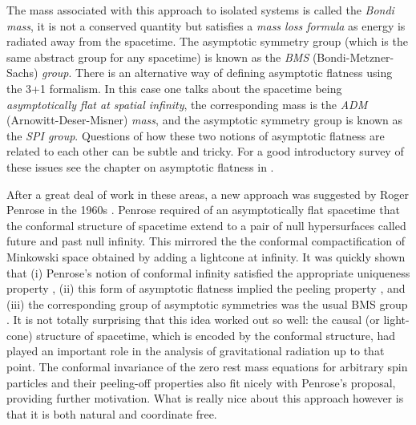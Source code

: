 \documentclass[a4paper,12pt]{amsart}
\theoremstyle{remark}
\begin{document}
The mass associated with this approach to isolated systems is called
the \emph{Bondi mass}, it is not a conserved quantity but satisfies
a \emph{mass loss formula} as energy is radiated away from the spacetime.
The asymptotic symmetry group (which is the same abstract group for
any spacetime) is known as the \emph{BMS} (Bondi-Metzner-Sachs) \emph{group}.
There is an alternative way of defining asymptotic flatness using
the 3+1 formalism. In this case one talks about the spacetime being
\emph{asymptotically flat at spatial infinity}, the corresponding
mass is the \emph{ADM} (Arnowitt-Deser-Misner) \emph{mass}, and the
asymptotic symmetry group is known as the \emph{SPI group}. Questions
of how these two notions of asymptotic flatness are related to each
other can be subtle and tricky. For a good introductory survey of
these issues see the chapter on asymptotic flatness in \cite{Wald}.

After a great deal of work in these areas, a new approach was
suggested by Roger Penrose in the 1960s
\cite{Penrose-ConfInfLetter,Penrose-LightConeInf,Penrose-zrmFieldAsympt}.
Penrose required of an asymptotically flat spacetime that the
conformal structure of spacetime extend to a pair of null
hypersurfaces called future and past null infinity. This mirrored the
the conformal compactification of Minkowski space obtained by adding a
lightcone at infinity. It was quickly shown that (i) Penrose's notion
of conformal infinity satisfied the appropriate uniqueness property \cite{Geroch-LocalChar},
(ii) this form of asymptotic flatness implied the peeling property \cite{Penrose-ConfInfLetter,Penrose-zrmFieldAsympt}, and (iii) the corresponding group of asymptotic symmetries was the
usual BMS group \cite{Geroch-Asympt}. It is not totally surprising that this idea worked
out so well: the causal (or light-cone) structure of spacetime, which is encoded by the conformal structure, had
played an important role in the analysis of gravitational radiation up
to that point. The conformal invariance of the zero rest mass equations for arbitrary
spin particles and their peeling-off properties also fit nicely with Penrose's proposal, providing further motivation. What is really nice about this
approach however is that it is both natural and coordinate free.
\end{document}
